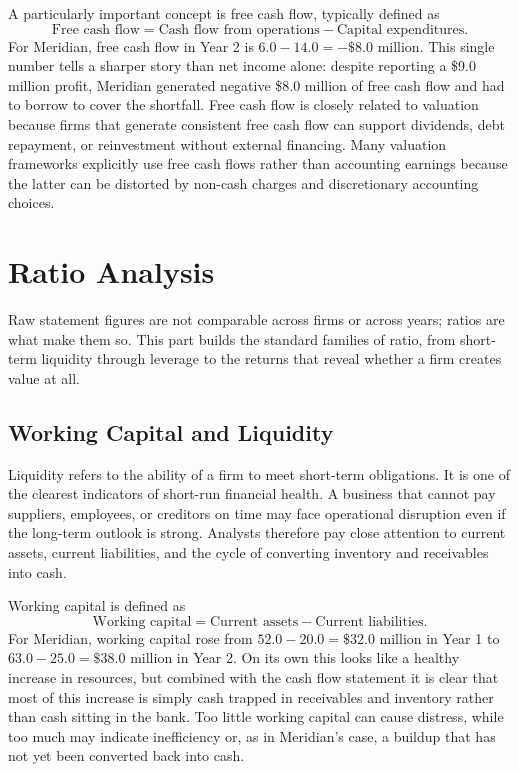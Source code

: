 \documentclass[../ai_in_finance]{subfiles}
\begin{document}
A particularly important concept is free cash flow, typically defined as
\begin{equation*}
\text{Free cash flow} = \text{Cash flow from operations} - \text{Capital expenditures}.
\end{equation*}
For Meridian, free cash flow in Year 2 is $6.0 - 14.0 = -\$8.0$ million. This single number tells a sharper story than net income alone: despite reporting a \$9.0 million profit, Meridian generated negative \$8.0 million of free cash flow and had to borrow to cover the shortfall. Free cash flow is closely related to valuation because firms that generate consistent free cash flow can support dividends, debt repayment, or reinvestment without external financing. Many valuation frameworks explicitly use free cash flows rather than accounting earnings because the latter can be distorted by non-cash charges and discretionary accounting choices.

\section{Ratio Analysis}

Raw statement figures are not comparable across firms or across years; ratios are what make them so. This part builds the standard families of ratio, from short-term liquidity through leverage to the returns that reveal whether a firm creates value at all.

\subsection{Working Capital and Liquidity}

Liquidity refers to the ability of a firm to meet short-term obligations. It is one of the clearest indicators of short-run financial health. A business that cannot pay suppliers, employees, or creditors on time may face operational disruption even if the long-term outlook is strong. Analysts therefore pay close attention to current assets, current liabilities, and the cycle of converting inventory and receivables into cash.

Working capital is defined as
\begin{equation*}
\text{Working capital} = \text{Current assets} - \text{Current liabilities}.
\end{equation*}
For Meridian, working capital rose from $52.0 - 20.0 = \$32.0$ million in Year 1 to $63.0 - 25.0 = \$38.0$ million in Year 2. On its own this looks like a healthy increase in resources, but combined with the cash flow statement it is clear that most of this increase is simply cash trapped in receivables and inventory rather than cash sitting in the bank. Too little working capital can cause distress, while too much may indicate inefficiency or, as in Meridian's case, a buildup that has not yet been converted back into cash.
\end{document}

